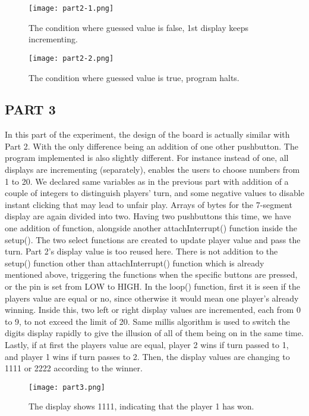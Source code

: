 \documentclass[pdftex,12pt,a4paper]{article}
\begin{document}
\begin{figure}[H]
	\centering
	\texttt{[image: part2-1.png]}	
	\caption{The condition where guessed value is false, 1st display keeps incrementing.}
	\label{fig5}
\end{figure}

\begin{figure}[H]
	\centering
	\texttt{[image: part2-2.png]}	
	\caption{The condition where guessed value is true, program halts.}
	\label{fig5}
\end{figure}

\subsection{PART 3}
In this part of the experiment, the design of the board is actually similar with Part 2. With the only difference being an addition of one other pushbutton. The program implemented is also slightly different. For instance instead of one, all displays are incrementing (separately), enables the users to choose numbers from 1 to 20. We declared same variables as in the previous part with addition of a couple of integers to distinguish players' turn, and some negative values to disable instant clicking that may lead to unfair play. Arrays of bytes for the 7-segment display are again divided into two. Having two pushbuttons this time, we have one addition of function, alongside another attachInterrupt() function inside the setup(). The two select functions are created to update player value and pass the turn. Part 2's display value is too reused here. There is not addition to the setup() function other than attachInterrupt() function which is already mentioned above, triggering the functions when the specific buttons are pressed, or the pin is set from LOW to HIGH. In the loop() function, first it is seen if the players value are equal or no, since otherwise it would mean one player's already winning. Inside this, two left or right display values are incremented, each from 0 to 9, to not exceed the limit of 20. Same millis algorithm is used to switch the digits display rapidly to give the illusion of all of them being on in the same time. Lastly, if at first the players value are equal, player 2 wins if turn passed to 1, and player 1 wins if turn passes to 2. Then, the display values are changing to 1111 or 2222 according to the winner. 

\begin{figure}[H]
	\centering
	\texttt{[image: part3.png]}	
	\caption{The display shows 1111, indicating that the player 1 has won.}
	\label{fig5}
\end{figure}
\end{document}
